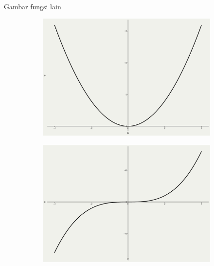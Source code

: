 \documentclass[
  ignorenonframetext,
]{beamer}
\begin{document}
\begin{frame}{Gambar fungsi lain}
\label{gambar-fungsi-lain}
\begin{figure}

\begin{minipage}{0.33\linewidth}

\begin{figure}[H]

{\centering \includegraphics{index_files/figure-beamer/unnamed-chunk-5-1.pdf}

}


\end{figure}%

\end{minipage}%
%
\begin{minipage}{0.33\linewidth}

\begin{figure}[H]

{\centering \includegraphics{index_files/figure-beamer/unnamed-chunk-5-2.pdf}

}
\end{figure}
\end{minipage}
\end{figure}
\end{frame}
\end{document}
